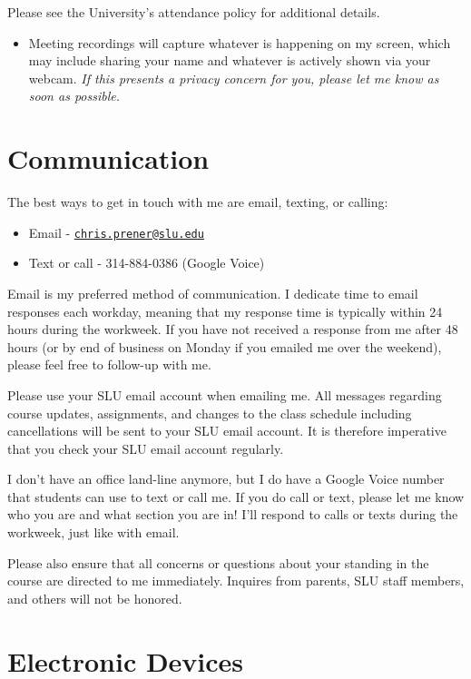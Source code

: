 \documentclass[
]{book}
\providecommand{\tightlist}{%
  \setlength{\itemsep}{0pt}\setlength{\parskip}{0pt}}
\newenvironment{rmdblock}[1]
  {\begin{shaded*}
  \begin{itemize}
  \renewcommand{\labelitemi}{
    \raisebox{-.7\height}[0pt][0pt]{
      {\setkeys{Gin}{width=3em,keepaspectratio}\texttt{[image: images/\#1]}}
    }
  }
  \item
  }
  {
  \end{itemize}
  \end{shaded*}
  }
\newenvironment{rmdwarning}
  {\begin{rmdblock}{warning}}
  {\end{rmdblock}}
\begin{document}
Please see the University's attendance policy for additional details.

\begin{rmdwarning}
Meeting recordings will capture whatever is happening on my screen,
which may include sharing your name and whatever is actively shown via
your webcam. \emph{If this presents a privacy concern for you, please
let me know as soon as possible.}
\end{rmdwarning}

\hypertarget{communication}{%
\section{Communication}\label{communication}}

The best ways to get in touch with me are email, texting, or calling:

\begin{itemize}
\tightlist
\item
  Email - \href{mailto:chris.prener@slu.edu}{\nolinkurl{chris.prener@slu.edu}}
\item
  Text or call - 314-884-0386 (Google Voice)
\end{itemize}

Email is my preferred method of communication. I dedicate time to email responses each workday, meaning that my response time is typically within 24 hours during the workweek. If you have not received a response from me after 48 hours (or by end of business on Monday if you emailed me over the weekend), please feel free to follow-up with me.

Please use your SLU email account when emailing me. All messages regarding course updates, assignments, and changes to the class schedule including cancellations will be sent to your SLU email account. It is therefore imperative that you check your SLU email account regularly.

I don't have an office land-line anymore, but I do have a Google Voice number that students can use to text or call me. If you do call or text, please let me know who you are and what section you are in! I'll respond to calls or texts during the workweek, just like with email.

Please also ensure that all concerns or questions about your standing in the course are directed to me immediately. Inquires from parents, SLU staff members, and others will not be honored.

\hypertarget{electronic-devices}{%
\section{Electronic Devices}\label{electronic-devices}}
\end{document}
